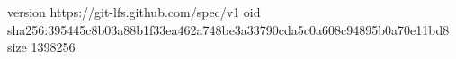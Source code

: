 version https://git-lfs.github.com/spec/v1
oid sha256:395445c8b03a88b1f33ea462a748be3a33790cda5c0a608c94895b0a70e11bd8
size 1398256
